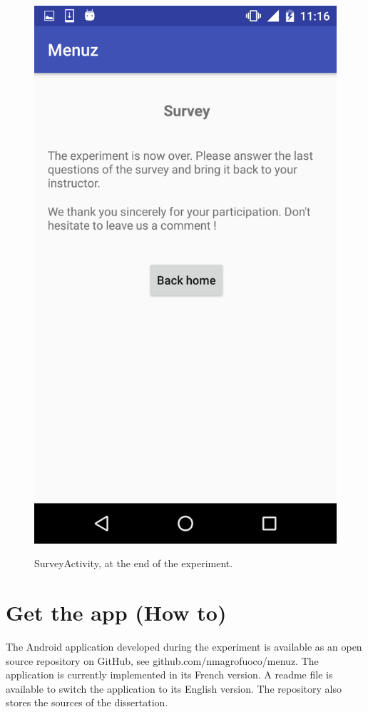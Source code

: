 \begin{figure}[!ht]
  \begin{center}
    \includegraphics[scale=0.22]{img/survey_activityb.png}
    \label{fig:survey_activityb}
    \caption{SurveyActivity, at the end of the experiment.}
  \end{center}
\end{figure}

\newpage

\chapter{Get the app (How to)}
The Android application developed during the experiment is available as an open 
source repository on GitHub, see github.com/nmagrofuoco/menuz. The 
application is currently implemented in its French version. A readme file is 
available to switch the application to its English version. The repository also 
stores the sources of the dissertation.